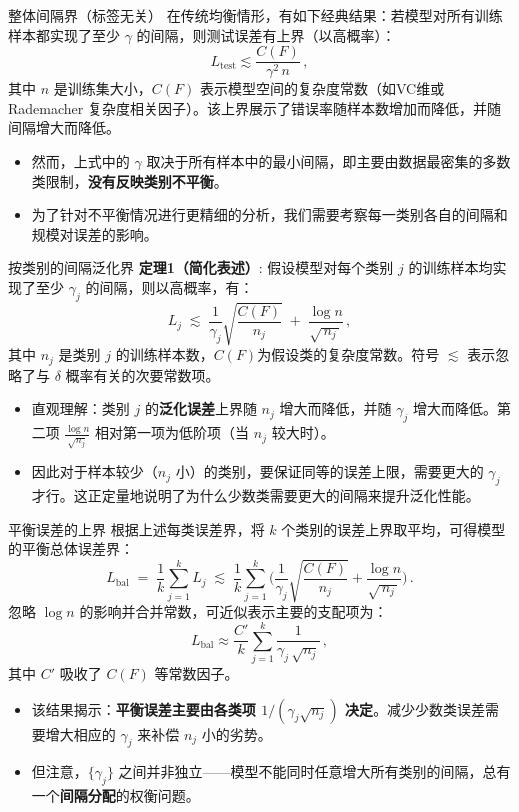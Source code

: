 \documentclass{beamer}
\begin{document}
\begin{frame}{整体间隔界（标签无关）}
    在传统均衡情形，有如下经典结果：若模型对所有训练样本都实现了至少 $\gamma$ 的间隔，则测试误差有上界（以高概率）：
    \[
        L_{\text{test}} \lesssim \frac{C(F)}{\gamma^2\,n}\,,
    \] 
    其中 $n$ 是训练集大小，$C(F)$ 表示模型空间的复杂度常数（如VC维或 Rademacher 复杂度相关因子）。该上界展示了错误率随样本数增加而降低，并随间隔增大而降低。
    \begin{itemize}
        \item 然而，上式中的 $\gamma$ 取决于所有样本中的最小间隔，即主要由数据最密集的多数类限制，\textbf{没有反映类别不平衡}。
        \item 为了针对不平衡情况进行更精细的分析，我们需要考察每一类别各自的间隔和规模对误差的影响。
    \end{itemize}
\end{frame}

\begin{frame}{按类别的间隔泛化界}
    \textbf{定理1（简化表述）}: 假设模型对每个类别 $j$ 的训练样本均实现了至少 $\gamma_j$ 的间隔，则以高概率，有：
    \[
        L_j \;\lesssim\; \frac{1}{\gamma_j}\sqrt{\frac{C(F)}{\,n_j\,}} \;+\; \frac{\log n}{\sqrt{\,n_j\,}}\,,
    \] 
    其中 $n_j$ 是类别 $j$ 的训练样本数，$C(F)$为假设类的复杂度常数。符号 $\lesssim$ 表示忽略了与 $\delta$ 概率有关的次要常数项。
    \begin{itemize}
        \item 直观理解：类别 $j$ 的\textbf{泛化误差}上界随 $n_j$ 增大而降低，并随 $\gamma_j$ 增大而降低。第二项 $\frac{\log n}{\sqrt{n_j}}$ 相对第一项为低阶项（当 $n_j$ 较大时）。
        \item 因此对于样本较少（$n_j$ 小）的类别，要保证同等的误差上限，需要更大的 $\gamma_j$ 才行。这正定量地说明了为什么少数类需要更大的间隔来提升泛化性能。
    \end{itemize}
\end{frame}

\begin{frame}{平衡误差的上界}
    根据上述每类误差界，将 $k$ 个类别的误差上界取平均，可得模型的平衡总体误差界：
    \[
        L_{\text{bal}} \;=\; \frac{1}{k}\sum_{j=1}^k L_j \;\lesssim\; \frac{1}{k}\sum_{j=1}^k\!\Big( \frac{1}{\gamma_j}\sqrt{\frac{C(F)}{\,n_j\,}} + \frac{\log n}{\sqrt{\,n_j\,}}\Big)\,.
    \]
    忽略 $\log n$ 的影响并合并常数，可近似表示主要的支配项为：
    \[
        L_{\text{bal}} \approx \frac{C'}{k} \sum_{j=1}^k \frac{1}{\gamma_j\,\sqrt{n_j}}\,,
    \] 
    其中 $C'$ 吸收了 $C(F)$ 等常数因子。
    \begin{itemize}
        \item 该结果揭示：\textbf{平衡误差主要由各类项 $1/(\gamma_j\sqrt{n_j})$ 决定}。减少少数类误差需要增大相应的 $\gamma_j$ 来补偿 $n_j$ 小的劣势。
        \item 但注意，$\{\gamma_j\}$ 之间并非独立——模型不能同时任意增大所有类别的间隔，总有一个\textbf{间隔分配}的权衡问题。
    \end{itemize}
\end{frame}
\end{document}
